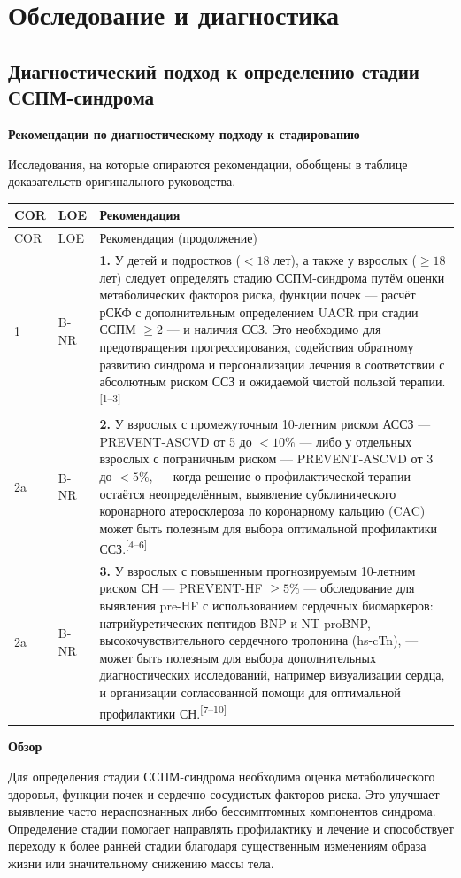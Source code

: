 \documentclass[11pt,a4paper]{article}
\newcommand{\src}[1]{\textsuperscript{[#1]}}
\newcommand{\heading}[1]{\par\medskip\textbf{#1}\par}
\begin{document}
\section{Обследование и диагностика}
\subsection{Диагностический подход к определению стадии ССПМ-синдрома}
\heading{Рекомендации по диагностическому подходу к стадированию}
Исследования, на которые опираются рекомендации, обобщены в таблице доказательств оригинального руководства.

{\small
\begin{longtable}{P{0.07\textwidth}P{0.11\textwidth}P{0.75\textwidth}}
\toprule COR & LOE & Рекомендация\\\midrule
\endfirsthead
\toprule COR & LOE & Рекомендация (продолжение)\\\midrule
{} & B-NR & \textbf{1.} У детей и подростков ($<18$ лет), а также у взрослых ($\geq18$ лет) следует определять стадию ССПМ-синдрома путём оценки метаболических факторов риска, функции почек --- расчёт рСКФ с дополнительным определением UACR при стадии ССПМ $\geq2$ --- и наличия ССЗ. Это необходимо для предотвращения прогрессирования, содействия обратному развитию синдрома и персонализации лечения в соответствии с абсолютным риском ССЗ и ожидаемой чистой пользой терапии.\src{1--3}\\[5pt]
2a & B-NR & \textbf{2.} У взрослых с промежуточным 10-летним риском АССЗ --- PREVENT-ASCVD от 5 до $<10\%$ --- либо у отдельных взрослых с пограничным риском --- PREVENT-ASCVD от 3 до $<5\%$, --- когда решение о профилактической терапии остаётся неопределённым, выявление субклинического коронарного атеросклероза по коронарному кальцию (CAC) может быть полезным для выбора оптимальной профилактики ССЗ.\src{4--6}\\[5pt]
2a & B-NR & \textbf{3.} У взрослых с повышенным прогнозируемым 10-летним риском СН --- PREVENT-HF $\geq5\%$ --- обследование для выявления pre-HF с использованием сердечных биомаркеров: натрийуретических пептидов BNP и NT-proBNP, высокочувствительного сердечного тропонина (hs-cTn), --- может быть полезным для выбора дополнительных диагностических исследований, например визуализации сердца, и организации согласованной помощи для оптимальной профилактики СН.\src{7--10}\\
\bottomrule
\end{longtable}
}

\heading{Обзор}
Для определения стадии ССПМ-синдрома необходима оценка метаболического здоровья, функции почек и сердечно-сосудистых факторов риска. Это улучшает выявление часто нераспознанных либо бессимптомных компонентов синдрома. Определение стадии помогает направлять профилактику и лечение и способствует переходу к более ранней стадии благодаря существенным изменениям образа жизни или значительному снижению массы тела.
\end{document}
